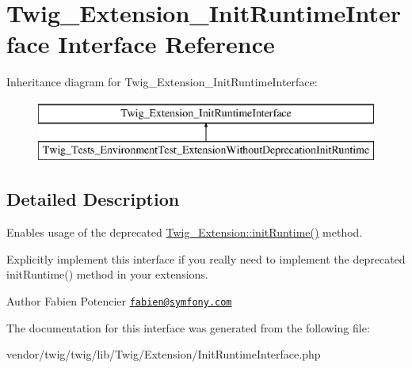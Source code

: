\hypertarget{interfaceTwig__Extension__InitRuntimeInterface}{}\section{Twig\+\_\+\+Extension\+\_\+\+Init\+Runtime\+Interface Interface Reference}
\label{interfaceTwig__Extension__InitRuntimeInterface}
Inheritance diagram for Twig\+\_\+\+Extension\+\_\+\+Init\+Runtime\+Interface\+:\begin{figure}[H]
\begin{center}
\leavevmode
\includegraphics[height=2.000000cm]{interfaceTwig__Extension__InitRuntimeInterface}
\end{center}
\end{figure}


\subsection{Detailed Description}
Enables usage of the deprecated \hyperlink{classTwig__Extension_af923cb6771b0d2df5d623af14d8fa3b2}{Twig\+\_\+\+Extension\+::init\+Runtime()} method.

Explicitly implement this interface if you really need to implement the deprecated init\+Runtime() method in your extensions.

\begin{DoxyAuthor}{Author}
Fabien Potencier \href{mailto:fabien@symfony.com}{\tt fabien@symfony.\+com} 
\end{DoxyAuthor}


The documentation for this interface was generated from the following file\+:\begin{DoxyCompactItemize}
\item 
vendor/twig/twig/lib/\+Twig/\+Extension/Init\+Runtime\+Interface.\+php\end{DoxyCompactItemize}
